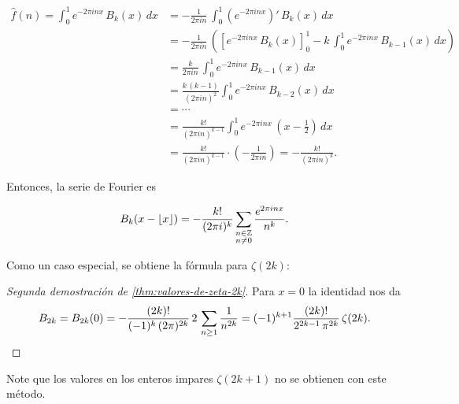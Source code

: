 \documentclass{article}
\numberwithin{equation}{section}
\theoremstyle{definition}
\begin{document}
\begin{align*}
  \widehat{f} (n) = \int_0^1 e^{-2\pi i n x} \, B_k (x)\,dx & = -\frac{1}{2\pi i n}\,\int_0^1 (e^{-2\pi i n x})' \, B_k (x)\,dx \\
                                                            & = -\frac{1}{2\pi i n}\,\left(\left[e^{-2\pi i n x}\,B_k (x)\right]_0^1 - k\,\int_0^1 e^{-2\pi i n x} \, B_{k-1} (x)\,dx\right) \\
                                                            & = \frac{k}{2\pi i n} \, \int_0^1 e^{-2\pi i n x}\,B_{k-1} (x)\,dx \\
                                                            & = \frac{k\,(k-1)}{(2\pi i n)^2} \int_0^1 e^{-2\pi i n x}\,B_{k-2} (x)\,dx \\
                                                            & = \cdots \\
                                                            & = \frac{k!}{(2\pi i n)^{k-1}} \int_0^1 e^{-2\pi i n x}\,\left(x - \frac{1}{2}\right)\,dx \\
                                                            & = \frac{k!}{(2\pi i n)^{k-1}} \cdot \left(-\frac{1}{2\pi i n}\right)
                                                              = -\frac{k!}{(2\pi i n)^k}.
\end{align*}

Entonces, la serie de Fourier es

\begin{equation}
  \label{serie-de-forier-para-Bk}
  B_k (x - \lfloor x\rfloor) = -\frac{k!}{(2\pi i)^k}\sum_{\substack{n\in \mathbb{Z} \\ n \ne 0}} \frac{e^{2\pi i n x}}{n^k}.
\end{equation}

Como un caso especial, se obtiene la fórmula para $\zeta (2k)$:

\begin{proof}[Segunda demostración de \ref{thm:valores-de-zeta-2k}]
  Para $x = 0$ la identidad  nos da
  \[ B_{2k} = B_{2k} (0) =
    -\frac{(2k)!}{(-1)^k\,(2\pi)^{2k}} \, 2\,\sum_{n \ge 1} \frac{1}{n^{2k}} =
    (-1)^{k+1}\frac{(2k)!}{2^{2k-1}\,\pi^{2k}}\,\zeta (2k). \qedhere \]
\end{proof}

Note que los valores en los enteros impares $\zeta (2k+1)$ no se obtienen con este método.

\end{document}
